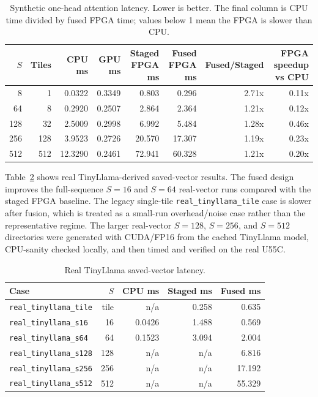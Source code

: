 \documentclass[conference]{IMSTemplate}
\begin{document}
\begin{table}[t]
\centering
\caption{Synthetic one-head attention latency. Lower is better. The final
column is CPU time divided by fused FPGA time; values below 1 mean the FPGA is
slower than CPU.}
\label{tab:synthetic}
\begin{tabular}{rrrrrrrr}
\toprule
\(S\) & Tiles & CPU ms & GPU ms & Staged FPGA ms & Fused FPGA ms & Fused/Staged & FPGA speedup vs CPU \\
\midrule
8   & 1   & 0.0322 & 0.3349 & 0.803  & 0.296  & 2.71x & 0.11x \\
64  & 8   & 0.2920 & 0.2507 & 2.864  & 2.364  & 1.21x & 0.12x \\
128 & 32  & 2.5009 & 0.2998 & 6.992  & 5.484  & 1.28x & 0.46x \\
256 & 128 & 3.9523 & 0.2726 & 20.570 & 17.307 & 1.19x & 0.23x \\
512 & 512 & 12.3290 & 0.2461 & 72.941 & 60.328 & 1.21x & 0.20x \\
\bottomrule
\end{tabular}
\end{table}

Table~\ref{tab:realvectors} shows real TinyLlama-derived saved-vector results.
The fused design improves the full-sequence \(S=16\) and \(S=64\) real-vector
runs compared with the staged FPGA baseline. The legacy single-tile
\texttt{real\_tinyllama\_tile} case is slower after fusion, which is treated as
a small-run overhead/noise case rather than the representative regime. The
larger real-vector \(S=128\), \(S=256\), and \(S=512\) directories were
generated with CUDA/FP16 from the cached TinyLlama model, CPU-sanity checked
locally, and then timed and verified on the real U55C.

\begin{table}[t]
\centering
\caption{Real TinyLlama saved-vector latency.}
\label{tab:realvectors}
\begin{tabular}{lrrrr}
\toprule
Case & \(S\) & CPU ms & Staged ms & Fused ms \\
\midrule
\texttt{real\_tinyllama\_tile} & tile & n/a & 0.258 & 0.635 \\
\texttt{real\_tinyllama\_s16} & 16 & 0.0426 & 1.488 & 0.569 \\
\texttt{real\_tinyllama\_s64} & 64 & 0.1523 & 3.094 & 2.004 \\
\texttt{real\_tinyllama\_s128} & 128 & n/a & n/a & 6.816 \\
\texttt{real\_tinyllama\_s256} & 256 & n/a & n/a & 17.192 \\
\texttt{real\_tinyllama\_s512} & 512 & n/a & n/a & 55.329 \\
\bottomrule
\end{tabular}
\end{table}
\end{document}
